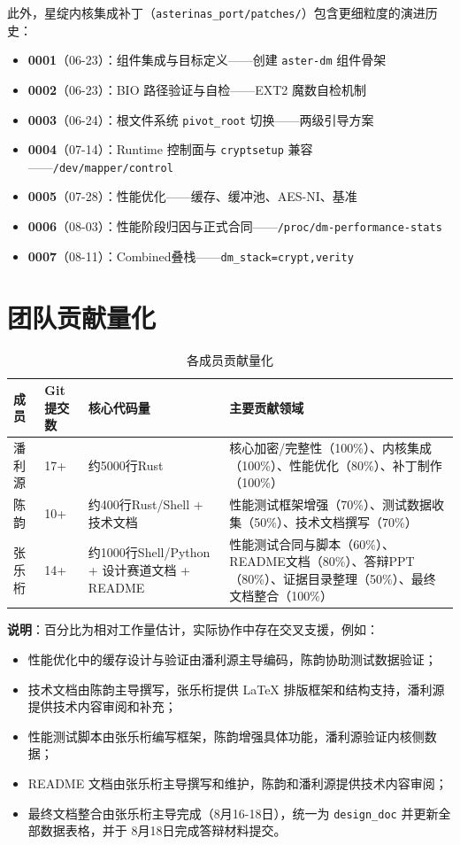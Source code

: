 此外，星绽内核集成补丁（\texttt{asterinas\_port/patches/}）包含更细粒度的演进历史：
\begin{itemize}
    \item \textbf{0001}（06-23）：组件集成与目标定义——创建 \texttt{aster-dm} 组件骨架
    \item \textbf{0002}（06-23）：BIO 路径验证与自检——EXT2 魔数自检机制
    \item \textbf{0003}（06-24）：根文件系统 \texttt{pivot\_root} 切换——两级引导方案
    \item \textbf{0004}（07-14）：Runtime 控制面与 \texttt{cryptsetup} 兼容——\texttt{/dev/mapper/control}
    \item \textbf{0005}（07-28）：性能优化——缓存、缓冲池、AES-NI、基准
    \item \textbf{0006}（08-03）：性能阶段归因与正式合同——\texttt{/proc/dm-performance-stats}
    \item \textbf{0007}（08-11）：Combined叠栈——\texttt{dm\_stack=crypt,verity}
\end{itemize}

\section{团队贡献量化}

\begin{table}[H]
    \centering
    \caption{各成员贡献量化}
    \begin{tabular}{p{}p{}p{}p{}}
        \toprule
        \textbf{成员} & \textbf{Git提交数} & \textbf{核心代码量} & \textbf{主要贡献领域} \\
        \midrule
        潘利源 & 17+ & 约5000行Rust & 核心加密/完整性（100\%）、内核集成（100\%）、性能优化（80\%）、补丁制作（100\%） \\
        陈韵 & 10+ & 约400行Rust/Shell + 技术文档 & 性能测试框架增强（70\%）、测试数据收集（50\%）、技术文档撰写（70\%） \\
        张乐桁 & 14+ & 约1000行Shell/Python + 设计赛道文档 + README & 性能测试合同与脚本（60\%）、README文档（80\%）、答辩PPT（80\%）、证据目录整理（50\%）、最终文档整合（100\%） \\
        \bottomrule
    \end{tabular}
\end{table}

\textbf{说明}：百分比为相对工作量估计，实际协作中存在交叉支援，例如：
\begin{itemize}
    \item 性能优化中的缓存设计与验证由潘利源主导编码，陈韵协助测试数据验证；
    \item 技术文档由陈韵主导撰写，张乐桁提供 LaTeX 排版框架和结构支持，潘利源提供技术内容审阅和补充；
    \item 性能测试脚本由张乐桁编写框架，陈韵增强具体功能，潘利源验证内核侧数据；
    \item README 文档由张乐桁主导撰写和维护，陈韵和潘利源提供技术内容审阅；
    \item 最终文档整合由张乐桁主导完成（8月16-18日），统一为 \texttt{design\_doc} 并更新全部数据表格，并于 8月18日完成答辩材料提交。
\end{itemize}

